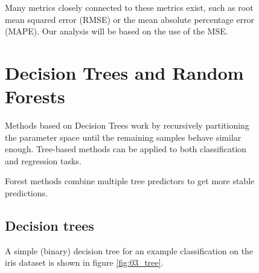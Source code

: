 \begin{figure}
Many metrics closely connected to these metrics exist, such as root mean squared error (RMSE)
or the mean absolute percentage error (MAPE).
Our analysis will be based on the use of the MSE.

\section{Decision Trees and Random Forests}
Methods based on Decision Trees work by recursively partitioning
the parameter space until the remaining samples behave similar enough.
Tree-based methods can be applied to both classification and regression tasks.

Forest methods combine multiple tree predictors to get more stable
predictions.

\subsection{Decision trees}
A simple (binary) decision tree
for an example classification on the iris dataset
is shown in figure \ref{fig:03_tree}.


\end{figure}
